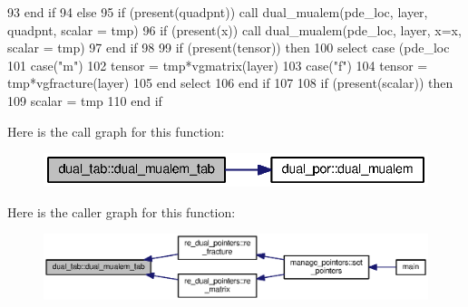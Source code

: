 \begin{DoxyCode}
93 \textcolor{keywordflow}{        end if} 
94       \textcolor{keywordflow}{else}
95         \textcolor{keywordflow}{if} (\textcolor{keyword}{present}(quadpnt)) \textcolor{keyword}{call }dual_mualem(pde\_loc, layer, quadpnt, scalar \textcolor{comment}{= tmp)}
96 \textcolor{comment}{        }\textcolor{keywordflow}{if} (\textcolor{keyword}{present}(x)) \textcolor{keyword}{call }dual_mualem(pde\_loc, layer, x=x, scalar = tmp)
97 \textcolor{keywordflow}{      end if}
98 
99       \textcolor{keywordflow}{if} (\textcolor{keyword}{present}(tensor)) \textcolor{keywordflow}{then}
100         \textcolor{keywordflow}{select case} (pde\_loc%
101           \textcolor{keywordflow}{case}(\textcolor{stringliteral}{"m"})
102             tensor = tmp*vgmatrix(layer)%
103           \textcolor{keywordflow}{case}(\textcolor{stringliteral}{"f"})
104              tensor = tmp*vgfracture(layer)%
105 \textcolor{keywordflow}{        end select}
106 \textcolor{keywordflow}{      end if}
107 
108       \textcolor{keywordflow}{if} (\textcolor{keyword}{present}(scalar)) \textcolor{keywordflow}{then}
109         scalar = tmp
110 \textcolor{keywordflow}{      end if}
\end{DoxyCode}


Here is the call graph for this function\+:
\nopagebreak
\begin{figure}[H]
\begin{center}
\leavevmode
\includegraphics[width=333pt]{namespacedual__tab_a7268f9bd1dd01ea5d2e7799ba210ef81_cgraph}
\end{center}
\end{figure}




Here is the caller graph for this function\+:\nopagebreak
\begin{figure}[H]
\begin{center}
\leavevmode
\includegraphics[width=350pt]{namespacedual__tab_a7268f9bd1dd01ea5d2e7799ba210ef81_icgraph}
\end{center}
\end{figure}


